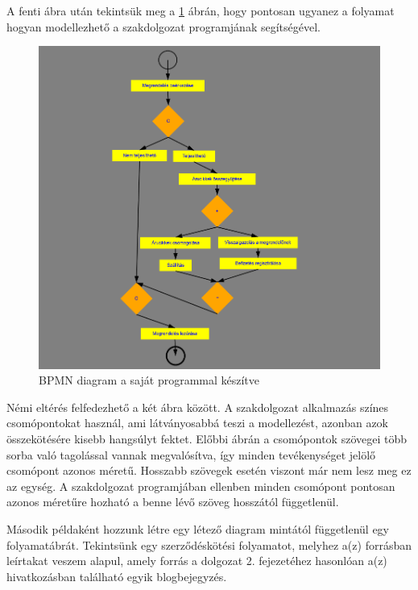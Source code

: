 A fenti ábra után tekintsük meg a \ref{fig:bpmn} ábrán, hogy pontosan ugyanez a folyamat hogyan modellezhető a szakdolgozat programjának segítségével.

\begin{figure}[h]
\centering
\includegraphics[scale=0.6]{images/pelda1.png}
\caption{BPMN diagram a saját programmal készítve}
\label{fig:bpmn}
\end{figure}

Némi eltérés felfedezhető a két ábra között. A szakdolgozat alkalmazás színes csomópontokat használ, ami látványosabbá teszi a modellezést, azonban azok összekötésére kisebb hangsúlyt fektet. Előbbi ábrán a csomópontok szövegei több sorba való tagolással vannak megvalósítva, így minden tevékenységet jelölő csomópont azonos méretű. Hosszabb szövegek esetén viszont már nem lesz meg ez az egység. A szakdolgozat programjában ellenben minden csomópont pontosan azonos méretűre hozható a benne lévő szöveg hosszától függetlenül.


Második példaként hozzunk létre egy létező diagram mintától függetlenül egy folyamatábrát. Tekintsünk egy szerződéskötési folyamatot, melyhez a(z) \cite{xflowutolso} forrásban leírtakat veszem alapul, amely forrás a dolgozat 2. fejezetéhez hasonlóan a(z) \cite{xflower} hivatkozásban található egyik blogbejegyzés.

